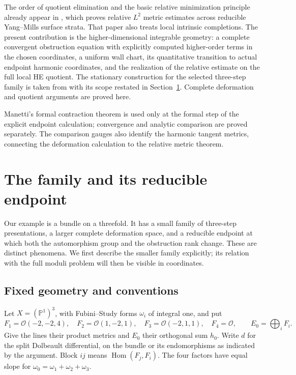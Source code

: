\documentclass[11pt]{amsart}
\theoremstyle{definition}
\theoremstyle{remark}
\newcommand{\PP}{\mathbb P}
\newcommand{\cO}{\mathcal O}
\newcommand{\Hom}{\operatorname{Hom}}
\begin{document}
The order of quotient elimination and the basic relative minimization
principle already appear in \cite{WuebbenRelativeMetrics26}, which
proves relative $L^2$ metric estimates across reducible Yang--Mills
surface strata. That paper also treats local intrinsic completions.
The present contribution is the higher-dimensional integrable geometry:
a complete convergent obstruction equation with explicitly computed
higher-order terms in the chosen coordinates, a uniform wall chart,
its quantitative transition to actual endpoint harmonic coordinates,
and the realization of the relative estimate on the full local HE
quotient. The stationary construction for the selected three-step
family is taken from \cite{wuebben2026three} with its scope restated
in Section~\ref{sec:geometry}. Complete deformation and quotient
arguments are proved here.

Manetti's formal contraction theorem \cite{manetti2005} is used only
at the formal step of the explicit endpoint calculation; convergence
and analytic comparison are proved separately. The comparison gauges
also identify the harmonic tangent metrics, connecting the deformation
calculation to the relative metric theorem.

\section{The family and its reducible endpoint}\label{sec:geometry}

Our example is a bundle on a threefold. It has a small family of
three-step presentations, a larger complete deformation space, and a
reducible endpoint at which both the automorphism group and the obstruction
rank change. These are distinct phenomena. We first describe the smaller
family explicitly; its relation with the full moduli problem will then
be visible in coordinates.

\subsection{Fixed geometry and conventions}
Let $X=(\PP^1)^3$, with Fubini--Study forms $\omega_i$ of integral one,
and put
\begin{equation}\label{eq:lines}
 F_1=\cO(-2,-2,4),\quad F_2=\cO(1,-2,1),\quad
 F_3=\cO(-2,1,1),\quad F_4=\cO,\qquad E_0=\bigoplus_iF_i.
\end{equation}
Give the lines their product metrics and $E_0$ their orthogonal sum
$h_0$. Write $d$ for the split Dolbeault differential, on the bundle
or its endomorphisms as indicated by the argument. Block $ij$ means
$\Hom(F_j,F_i)$. The four factors have equal slope for
$\omega_0=\omega_1+\omega_2+\omega_3$.
\end{document}
